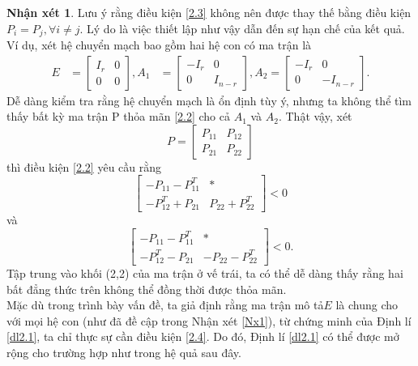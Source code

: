 \documentclass[12pt,a4paper]{report}
\theoremstyle{definition}
\newtheorem{nx}{Nhận xét}
\theoremstyle{definition}
\numberwithin{dl}{chapter}
\numberwithin{vd}{chapter}
\numberwithin{corollary}{chapter}
\numberwithin{lemma}{chapter}
\numberwithin{md}{chapter}
\numberwithin{dn}{chapter}
\numberwithin{cy}{chapter}
\numberwithin{nx}{chapter}
\begin{document}
\begin{nx}   Lưu ý rằng điều kiện \eqref{2.3} không nên được thay thế bằng điều kiện  $P_{i}=P_{j}, \forall i \neq j$. Lý do là việc thiết lập như vậy dẫn đến sự hạn chế của kết quả. Ví dụ, xét hệ chuyển mạch bao gồm hai hệ con có ma trận là
\begin{equation}\label{2.22}
\begin{aligned}
E &=\left[\begin{array}{cc}
I_{r} & 0 \\
0 & 0
\end{array}\right],
A_{1} &=\left[\begin{array}{cc}
-I_{r} & 0 \\
0 & I_{n-r}
\end{array}\right], A_{2}=\left[\begin{array}{cc}
-I_{r} & 0 \\
0 & -I_{n-r}
\end{array}\right].
\end{aligned}
\end{equation}
Dễ dàng kiểm tra rằng hệ chuyển mạch là ổn định tùy ý, nhưng ta không thể tìm thấy bất kỳ ma trận P thỏa mãn \eqref{2.2} cho cả  $A_{1}$ và $A_{2}$. Thật vậy, xét
$$
P=\left[\begin{array}{ll}
P_{11} & P_{12} \\
P_{21} & P_{22}
\end{array}\right]
$$
thì điều kiện \eqref{2.2} yêu cầu rằng
\begin{equation}\label{2.23}
\left[\begin{array}{cc}
-P_{11}-P_{11}^{T} & * \\
-P_{12}^{T}+P_{21} & P_{22}+P_{22}^{T}
\end{array}\right]<0 
\end{equation}
và
\begin{equation}\label{2.24}
\left[\begin{array}{cc}
-P_{11}-P_{11}^{T} & * \\
-P_{12}^{T}-P_{21} & -P_{22}-P_{22}^{T}
\end{array}\right]<0 .
\end{equation}
Tập trung vào khối (2,2) của ma trận ở vế trái, ta có thể dễ dàng thấy rằng hai bất đẳng thức trên không thể đồng thời được thỏa mãn.\\
Mặc dù trong trình bày vấn đề, ta giả định rằng ma trận mô tả$E$ là chung cho với mọi hệ con (như đã đề cập trong Nhận xét \ref{Nx1}), từ chứng minh của Định lí \ref{dl2.1}, ta chỉ thực sự cần điều kiện \eqref{2.4}. Do đó, Định lí \ref{dl2.1} có thể được mở rộng cho trường hợp như trong hệ quả sau đây.\\
\end{nx} 
\end{document}
